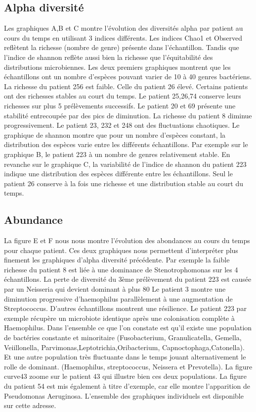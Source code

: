 \documentclass[12pt,a4paper]{article}
\begin{document}
\subsection{Alpha diversité}
Les graphiques A,B et C montre l’évolution des diversités alpha par patient au cours du temps en utilisant 3 indices différents. Les indices Chao1 et Observed reflètent la richesse (nombre de genre) présente dans l’échantillon. Tandis que l’indice de shannon reflète aussi bien la richesse que l’équitabilité des distributions microbiennes.
Les deux premiers graphiques montrent que les échantillons ont un nombre d’espèces pouvant varier de 10 à 40 genres bactériens. La richesse du patient 256 est faible. Celle du patient 26 élevé.
Certains patients ont des richesses stables au court du temps. Le patient 25,26,74 conserve leurs richesses sur plus 5 prélèvements successifs. Le patient 20 et 69 présente une stabilité entrecoupée par des pics de diminution. La richesse du patient 8 diminue progressivement. Le patient 23, 232 et 248 ont des fluctuations chaotiques.
Le graphique de shannon montre que pour un nombre d’espèces constant, la distribution des espèces varie entre les différents échantillons. Par exemple sur le graphique B, le patient 223 à un nombre de genres relativement stable. En revanche sur le graphique C, la variabilité de l’indice de shannon du patient 223 indique une distribution des espèces différente entre les échantillons. Seul le patient 26 conserve à la fois une richesse et une distribution stable au court du temps.
\subsection{Abundance}
La figure E et F nous nous montre l’évolution des abondances au cours du temps pour chaque patient. Ces deux graphiques nous permettent d’interpréter plus finement les graphiques d’alpha diversité précédente.
Par exemple la faible richesse du patient 8 est liée à une dominance de Stenotrophomonas sur les 4 échantillons.
La perte de diversité du 3ème prélèvement du patient 223 est causée par un Neisseria qui devient dominant à plus 80%
Le patient 3 montre une diminution progressive d’haemophilus parallèlement à une augmentation de Streptococcus.
D’autres échantillons montrent une résilience. Le patient 223 par exemple récupère un microbiote identique après une colonisation complète à Haemophilus.
Dans l’ensemble ce que l’on constate est qu’il existe une population de bactéries constante et minoritaire (Fusobacterium, Granulicatella, Gemella, Veiillonella, Parvimonas,Leptotrichia,Oribacterium, Capnoctophaga,Catonella). Et une autre population très fluctuante dans le temps jouant alternativement le rolle de dominant. (Haemophilus, streptococcus, Neissera et Prevotella).
La figure curve43 zoome sur le patient 43 qui illustre bien ces deux populations.
La figure du patient 54 est mis également à titre d’exemple, car elle montre l’apparition de Pseudomonas Aeruginosa.
L’ensemble des graphiques individuels est disponible sur cette adresse.
\end{document}
